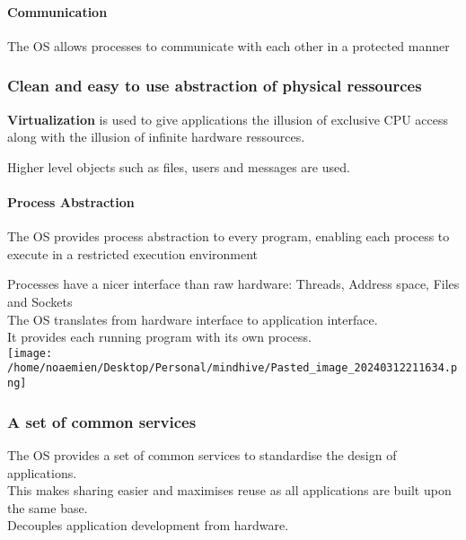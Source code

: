 \documentclass[
]{article}
\begin{document}
\hypertarget{communication}{%
\paragraph{Communication}\label{communication}}

The OS allows processes to communicate with each other in a protected
manner

\hypertarget{clean-and-easy-to-use-abstraction-of-physical-ressources}{%
\subsubsection{\texorpdfstring{Clean and easy to use \textbf{abstraction
of physical
ressources}}{Clean and easy to use abstraction of physical ressources}}\label{clean-and-easy-to-use-abstraction-of-physical-ressources}}

\textbf{Virtualization} is used to give applications the illusion of
exclusive CPU access along with the illusion of infinite hardware
ressources.

Higher level objects such as files, users and messages are used.

\hypertarget{process-abstraction}{%
\paragraph{Process Abstraction}\label{process-abstraction}}

The OS provides process abstraction to every program, enabling each
process to execute in a restricted execution environment

Processes have a nicer interface than raw hardware: Threads, Address
space, Files and Sockets\\
The OS translates from hardware interface to application interface.\\
It provides each running program with its own process.\\
\texttt{[image: /home/noaemien/Desktop/Personal/mindhive/Pasted\_image\_20240312211634.png]}

\hypertarget{a-set-of-common-services}{%
\subsubsection{\texorpdfstring{A set of \textbf{common
services}}{A set of common services}}\label{a-set-of-common-services}}

The OS provides a set of common services to standardise the design of
applications.\\
This makes sharing easier and maximises reuse as all applications are
built upon the same base.\\
Decouples application development from hardware.
\end{document}
